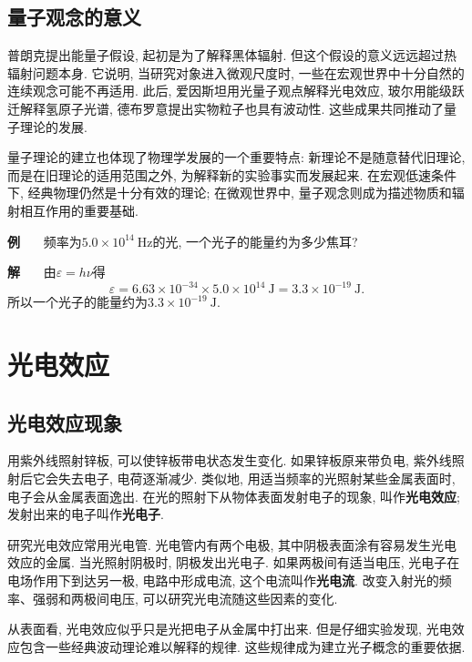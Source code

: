 \documentclass[11pt,a4paper]{ctexbook}
\newcounter{exam}[chapter]
\newcommand{\bre}{\ \ \ }
\newcommand{\examlabel}{\textbf{例\theexam}}
\newcommand{\soln}{\textbf{解}\bre}
\newcommand{\unit}[1]{\ \mathrm{#1}}
\newenvironment{example}{\bigskip\par\refstepcounter{exam}\examlabel\bre}{\par}
\newenvironment{solution}{\par\soln}{\par\bigskip}
\begin{document}
\subsection{量子观念的意义}

普朗克提出能量子假设, 起初是为了解释黑体辐射. 但这个假设的意义远远超过热辐射问题本身. 它说明, 当研究对象进入微观尺度时, 一些在宏观世界中十分自然的连续观念可能不再适用. 此后, 爱因斯坦用光量子观点解释光电效应, 玻尔用能级跃迁解释氢原子光谱, 德布罗意提出实物粒子也具有波动性. 这些成果共同推动了量子理论的发展.

量子理论的建立也体现了物理学发展的一个重要特点: 新理论不是随意替代旧理论, 而是在旧理论的适用范围之外, 为解释新的实验事实而发展起来. 在宏观低速条件下, 经典物理仍然是十分有效的理论; 在微观世界中, 量子观念则成为描述物质和辐射相互作用的重要基础.

\begin{example}
频率为$5.0\times10^{14}\unit{Hz}$的光, 一个光子的能量约为多少焦耳?
\end{example}
\begin{solution}
由$\varepsilon=h\nu$得
$$\varepsilon=6.63\times10^{-34}\times5.0\times10^{14}\unit{J}=3.3\times10^{-19}\unit{J}.$$
所以一个光子的能量约为$3.3\times10^{-19}\unit{J}$.
\end{solution}

\section{光电效应}

\subsection{光电效应现象}

用紫外线照射锌板, 可以使锌板带电状态发生变化. 如果锌板原来带负电, 紫外线照射后它会失去电子, 电荷逐渐减少. 类似地, 用适当频率的光照射某些金属表面时, 电子会从金属表面逸出. 在光的照射下从物体表面发射电子的现象, 叫作\textbf{光电效应}; 发射出来的电子叫作\textbf{光电子}.

研究光电效应常用光电管. 光电管内有两个电极, 其中阴极表面涂有容易发生光电效应的金属. 当光照射阴极时, 阴极发出光电子. 如果两极间有适当电压, 光电子在电场作用下到达另一极, 电路中形成电流, 这个电流叫作\textbf{光电流}. 改变入射光的频率、强弱和两极间电压, 可以研究光电流随这些因素的变化.

从表面看, 光电效应似乎只是光把电子从金属中打出来. 但是仔细实验发现, 光电效应包含一些经典波动理论难以解释的规律. 这些规律成为建立光子概念的重要依据.
\end{document}
